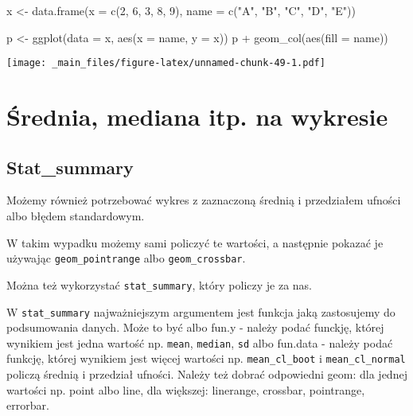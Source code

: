 \documentclass[
]{book}
\newenvironment{Shaded}{\begin{snugshade}}{\end{snugshade}}
\newcommand{\AttributeTok}[1]{\textcolor[rgb]{0.77,0.63,0.00}{#1}}
\newcommand{\DecValTok}[1]{\textcolor[rgb]{0.00,0.00,0.81}{#1}}
\newcommand{\FunctionTok}[1]{\textcolor[rgb]{0.00,0.00,0.00}{#1}}
\newcommand{\NormalTok}[1]{#1}
\newcommand{\OtherTok}[1]{\textcolor[rgb]{0.56,0.35,0.01}{#1}}
\newcommand{\SpecialCharTok}[1]{\textcolor[rgb]{0.00,0.00,0.00}{#1}}
\newcommand{\StringTok}[1]{\textcolor[rgb]{0.31,0.60,0.02}{#1}}
\begin{document}
\begin{Shaded}
\begin{Highlighting}[]
\NormalTok{x }\OtherTok{\textless{}{-}} \FunctionTok{data.frame}\NormalTok{(}\AttributeTok{x =} \FunctionTok{c}\NormalTok{(}\DecValTok{2}\NormalTok{, }\DecValTok{6}\NormalTok{, }\DecValTok{3}\NormalTok{, }\DecValTok{8}\NormalTok{, }\DecValTok{9}\NormalTok{), }\AttributeTok{name =} \FunctionTok{c}\NormalTok{(}\StringTok{"A"}\NormalTok{, }\StringTok{"B"}\NormalTok{, }\StringTok{"C"}\NormalTok{, }\StringTok{"D"}\NormalTok{, }\StringTok{"E"}\NormalTok{))}

\NormalTok{p }\OtherTok{\textless{}{-}} \FunctionTok{ggplot}\NormalTok{(}\AttributeTok{data =}\NormalTok{ x, }\FunctionTok{aes}\NormalTok{(}\AttributeTok{x =}\NormalTok{ name, }\AttributeTok{y =}\NormalTok{ x))}
\NormalTok{p }\SpecialCharTok{+} \FunctionTok{geom\_col}\NormalTok{(}\FunctionTok{aes}\NormalTok{(}\AttributeTok{fill =}\NormalTok{ name))}
\end{Highlighting}
\end{Shaded}

\texttt{[image: \_main\_files/figure-latex/unnamed-chunk-49-1.pdf]}

\hypertarget{ux15brednia-mediana-itp.-na-wykresie}{%
\section{Średnia, mediana itp. na wykresie}\label{ux15brednia-mediana-itp.-na-wykresie}}

\hypertarget{stat_summary}{%
\subsection{Stat\_summary}\label{stat_summary}}

Możemy również potrzebować wykres z zaznaczoną średnią i przedziałem ufności albo błędem standardowym.

W takim wypadku możemy sami policzyć te wartości, a następnie pokazać je używając \texttt{geom\_pointrange} albo \texttt{geom\_crossbar}.

Można też wykorzystać \texttt{stat\_summary}, który policzy je za nas.

W \texttt{stat\_summary} najważniejszym argumentem jest funkcja jaką zastosujemy do podsumowania danych. Może to być albo fun.y - należy podać funckję, której wynikiem jest jedna wartość np. \texttt{mean}, \texttt{median}, \texttt{sd} albo fun.data - należy podać funkcję, której wynikiem jest więcej wartości np. \texttt{mean\_cl\_boot} i \texttt{mean\_cl\_normal} policzą średnią i przedział ufności. Należy też dobrać odpowiedni geom: dla jednej wartości np. point albo line, dla większej: linerange, crossbar, pointrange, errorbar.
\end{document}
